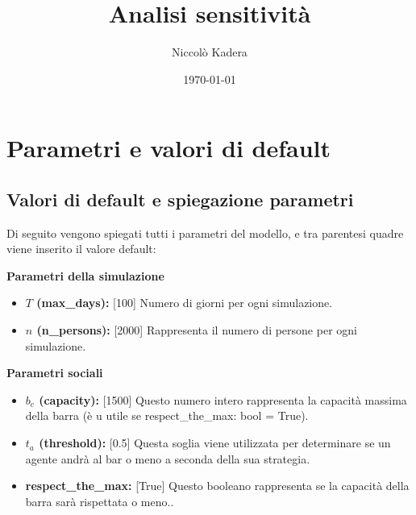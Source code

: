 \documentclass{article}
\title{Analisi sensitività}
\author{Niccolò Kadera}
\date{\today}
\begin{document}
{\selectfont
\maketitle

\section{Parametri e valori di default}

\subsection{Valori di default e spiegazione parametri}
Di seguito vengono spiegati tutti i parametri del modello, e tra parentesi quadre viene inserito il valore default: \newline

    \textbf{Parametri della simulazione}
    \begin{itemize}
        \item \textbf{$T$ (max\_days):} [100] Numero di giorni per ogni simulazione.
        \item \textbf{$n$ (n\_persons):} [2000] Rappresenta il numero di persone per ogni simulazione.\newline
    \end{itemize}

    \textbf{Parametri sociali}
    \begin{itemize}
        \item \textbf{$b_{c}$ (capacity):} [1500] Questo numero intero rappresenta la capacità massima della barra (è u utile se respect\_the\_max: bool = True).
        \item \textbf{$t_a$ (threshold): } [0.5] Questa soglia viene utilizzata per determinare se un agente andrà al bar o meno a seconda della sua strategia.
        \item \textbf{respect\_the\_max: } [True] Questo booleano rappresenta se la capacità della barra sarà rispettata o meno..\newline
    \end{itemize}

}
\end{document}
